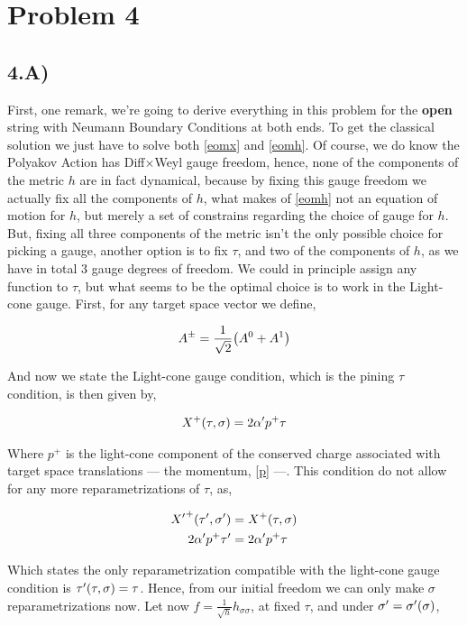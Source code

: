 \section{Problem 4}
\subsection{4.A)}

First, one remark, we're going to derive everything in this problem for the \textbf{open} string with 
Neumann Boundary Conditions at both ends. To get the classical solution we just have to solve both
\ref{eomx} and \ref{eomh}. Of course, we do know the Polyakov Action has  Diff$\times$Weyl gauge freedom, hence, 
none of the components of the metric $h$ are in fact dynamical, because by fixing this gauge freedom we actually 
fix all the components of $h$, what makes of \ref{eomh} not an equation of motion for $h$, but merely a set of 
constrains regarding the choice of gauge for $h$. But, fixing all three components of the metric isn't the 
only possible choice for picking a gauge, another option is to fix $\tau$, and two of the components 
of $h$, as we have in total 3 gauge degrees of freedom. We could in principle assign any function to $\tau$, but 
what seems to be the optimal choice is to work in the Light-cone gauge. First, for any target space vector we define,

\begin{align*}
    A^\pm=\frac{1}{\sqrt2}\qty(A^0+A^1)
\end{align*}

And now we state the Light-cone gauge condition, which is the pining $\tau$ condition, is then given by,

\begin{align*}
    X^+\qty(\tau,\sigma)=2\alpha'p^+\tau
\end{align*}

Where $p^+$ is the light-cone component of the conserved charge associated with target space translations --- the momentum, \ref{p} ---. This 
condition do not allow for any more reparametrizations of $\tau$, as,

\begin{align*}
    {X'}^+\qty(\tau',\sigma')&=X^+\qty(\tau,\sigma)\\
    2\alpha'p^+\tau'&=2\alpha'p^+\tau
\end{align*}

Which states the only reparametrization compatible with the light-cone gauge condition is $\tau'\qty(\tau,\sigma)=\tau$. Hence, from our 
initial freedom we can only make $\sigma$ reparametrizations now. Let now $f=\frac{1}{\sqrt h}h_{\sigma\sigma}$, at fixed $\tau$, and 
under $\sigma'=\sigma'\qty(\sigma)$,

